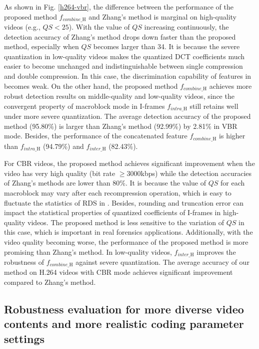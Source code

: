 \documentclass[journal,sort]{IEEEtran}
\begin{document}
As shown in Fig. \ref{h264-vbr}, the difference between the performance of the proposed method $f_{combine\_\text{H}}$ and Zhang's method is marginal on high-quality videos (e.g., $QS<25$). With the value of $QS$ increasing continuously, the detection accuracy of Zhang's method drops down faster than the proposed method, especially when $QS$ becomes larger than 34. It is because the severe quantization in low-quality videos makes the quantized DCT coefficients much easier to become unchanged and indistinguishable between single compression and double compression. In this case, the discrimination capability of features in \cite{zhang2016detecting} becomes weak. On the other hand, the proposed method $f_{combine\_\text{H}}$ achieves more robust detection results on middle-quality and low-quality videos, since the convergent property of macroblock mode in I-frames $f_{intra\_\text{H}}$ still retains well under more severe quantization. The average detection accuracy of the proposed method (95.80\%) is larger than Zhang's method (92.99\%) by 2.81\% in VBR mode. Besides, the performance of the concatenated feature $f_{combine\_\text{H}}$ is higher than $f_{intra\_\text{H}}$ (94.79\%) and $f_{inter\_\text{H}}$ (82.43\%).
 
For CBR videos, the proposed method achieves significant improvement when the video has very high quality (bit rate $\geq 3000$kbps) while the detection accuracies of Zhang's methods are lower than 80\%. It is because the value of $QS$ for each macroblock may vary after each recompression operation, which is easy to fluctuate the statistics of RDS in \cite{zhang2016detecting}. Besides, rounding and truncation error can impact the statistical properties of quantized coefficients of I-frames in high-quality videos. The proposed method is less sensitive to the variation of $QS$ in this case, which is important in real forensics applications. Additionally, with the video quality becoming worse, the performance of the proposed method is more promising than Zhang's method. In low-quality videos, $f_{inter\_\text{H}}$ improves the robustness of $f_{combine\_\text{H}}$ against severe quantization. The average accuracy of our method on H.264 videos with CBR mode achieves significant improvement compared to Zhang's method.

\subsection{Robustness evaluation for more diverse video contents and more realistic coding parameter settings\label{realistic}}
\end{document}
